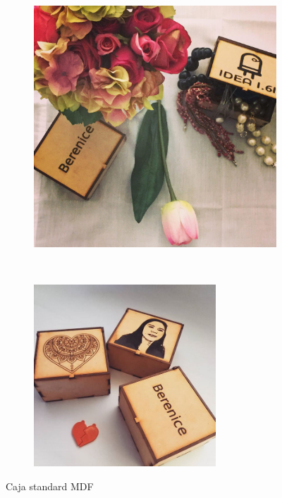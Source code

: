 \documentclass[]{article}
\begin{document}
\begin{figure}[h!]
	\centering
	\begin{subfigure}[b]{0.4\textwidth}
			\includegraphics[width=1\textwidth]{CajasPersonalizadas}
	\end{subfigure}
	~ %
	\begin{subfigure}[b]{0.4\textwidth}	
		\includegraphics[width=0.75\textwidth]{AmorAmistad}
	\end{subfigure}
	\caption{Caja standard MDF}
    \label{fig:cajaStdMDF}
\end{figure}
\end{document}
